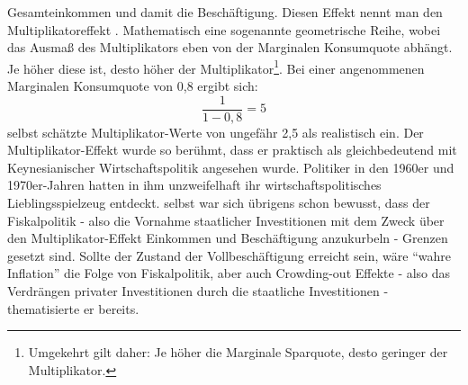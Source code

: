 Gesamteinkommen und damit die Beschäftigung. Diesen Effekt nennt man den Multiplikatoreffekt \parencite[S. 115]{Keynes1936}. Mathematisch eine sogenannte geometrische Reihe, wobei das Ausmaß des Multiplikators eben von der Marginalen Konsumquote abhängt. Je höher diese ist, desto höher der Multiplikator\footnote{Umgekehrt gilt daher: Je höher die Marginale Sparquote, desto geringer der Multiplikator.}. Bei einer angenommenen Marginalen Konsumquote von 0,8 ergibt sich: $$\frac{1}{1-0,8} = 5$$ \textcite[S. 128]{Keynes1936} selbst schätzte Multiplikator-Werte von ungefähr 2,5 als realistisch ein. Der Multiplikator-Effekt wurde so berühmt, dass er praktisch als gleichbedeutend mit Keynesianischer Wirtschaftspolitik angesehen wurde. Politiker in den 1960er und 1970er-Jahren hatten in ihm unzweifelhaft ihr wirtschaftspolitisches Lieblingsspielzeug entdeckt. \textcite[S. 118ff]{Keynes1936} selbst war sich übrigens schon bewusst, dass der Fiskalpolitik - also die Vornahme staatlicher Investitionen mit dem Zweck über den Multiplikator-Effekt Einkommen und Beschäftigung anzukurbeln - Grenzen gesetzt sind. Sollte der Zustand der Vollbeschäftigung erreicht sein, wäre "`wahre Inflation"' die Folge von Fiskalpolitik, aber auch Crowding-out Effekte - also das Verdrängen privater Investitionen durch die staatliche Investitionen - thematisierte er bereits.

